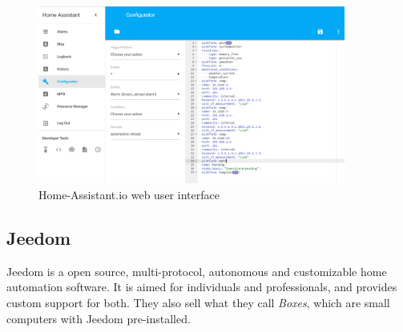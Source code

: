 \begin{figure}
	\centering
	\includegraphics[width=0.9\textwidth]{images/Chapter_04/home-assistant-configuration.png}
	\caption{Home-Assistant.io web user interface}
	\label{fig:home-assistant-configuration}
\end{figure}

\subsection{Jeedom}
Jeedom is a open source, multi-protocol, autonomous and customizable home automation software. It is aimed for individuals and 
professionals, and provides custom support for both. They also sell what they call \textit{Boxes}, which are small computers with
Jeedom pre-installed.

